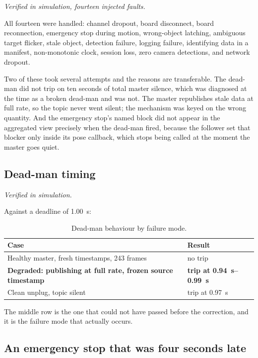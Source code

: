 \emph{Verified in simulation, fourteen injected faults.}

All fourteen were handled: channel dropout, board disconnect, board
reconnection, emergency stop during motion, wrong-object latching, ambiguous
target flicker, stale object, detection failure, logging failure, identifying
data in a manifest, non-monotonic clock, session loss, zero camera detections,
and network dropout.

Two of these took several attempts and the reasons are transferable. The
dead-man did not trip on ten seconds of total master silence, which was
diagnosed at the time as a broken dead-man and was not. The master republishes
stale data at full rate, so the topic never went silent; the mechanism was
keyed on the wrong quantity. And the emergency stop's named block did not
appear in the aggregated view precisely when the dead-man fired, because the
follower set that blocker only inside its pose callback, which stops being
called at the moment the master goes quiet.

\subsection{Dead-man timing}

\emph{Verified in simulation.}

Against a deadline of \SI{1.00}{\second}:

\begin{table}[htbp]
  \centering
  \caption{Dead-man behaviour by failure mode.}
  \label{tab:deadman}
  \begin{tabular}{@{}ll@{}}
    \toprule
    Case & Result \\
    \midrule
    Healthy master, fresh timestamps, 243 frames & no trip \\
    \textbf{Degraded: publishing at full rate, frozen source timestamp}
      & \textbf{trip at \SIrange{0.94}{0.99}{\second}} \\
    Clean unplug, topic silent & trip at \SI{0.97}{\second} \\
    \bottomrule
  \end{tabular}
\end{table}

The middle row is the one that could not have passed before the correction,
and it is the failure mode that actually occurs.

\subsection{An emergency stop that was four seconds late}

